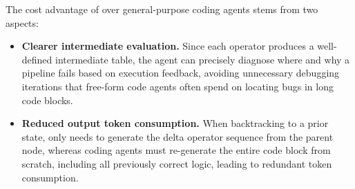 The cost advantage of \sys over general-purpose coding agents stems from two aspects:

\begin{itemize}[leftmargin=*]
    \item \textbf{Clearer intermediate evaluation.} Since each operator produces a well-defined intermediate table, the agent can precisely diagnose where and why a pipeline fails based on execution feedback, avoiding unnecessary debugging iterations that free-form code agents often spend on locating bugs in long code blocks.
    \item \textbf{Reduced output token consumption.} When backtracking to a prior state, \sys only needs to generate the delta operator sequence from the parent node, whereas coding agents must re-generate the entire code block from scratch, including all previously correct logic, leading to redundant token consumption.
\end{itemize}
